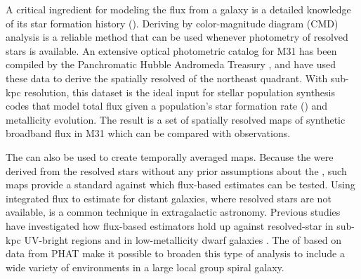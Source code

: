 \documentclass[iop, tighten]{emulateapj}
\begin{document}
A critical ingredient for modeling the flux from a galaxy is a detailed
knowledge of its star formation history (\sfh{}). Deriving  by
color-magnitude diagram (CMD) analysis is a reliable method that can be used
whenever photometry of resolved stars is available. An extensive optical
photometric catalog for M31 has been compiled by the Panchromatic Hubble
Andromeda Treasury \citep[PHAT;][]{Dalcanton:2012,Williams:2014}, and
\citet{Lewis:2015} have used these data to derive the spatially resolved \sfh{}
of the northeast quadrant. With sub-kpc resolution, this \sfh{} dataset is the
ideal input for stellar population synthesis codes that model total flux given a
population's star formation rate (\sfr{}) and metallicity evolution. The result
is a set of spatially resolved maps of synthetic broadband flux in M31 which can
be compared with observations.


\figi

The \citet{Lewis:2015}  can also be used to create temporally averaged
\sfr{} maps. Because the  were derived from the resolved stars without
any prior assumptions about the , such maps provide a standard against
which flux-based \sfr{} estimates \citep[e.g., using any of the calibrations
from][]{Kennicutt:2012} can be tested. Using integrated flux to estimate 
for distant galaxies, where resolved stars are not available, is a common
technique in extragalactic astronomy. Previous studies have investigated how
flux-based \sfr{} estimators hold up against resolved-star  in sub-kpc
UV-bright regions \citep{Simones:2014} and in low-metallicity dwarf galaxies
\citep{Johnson:2013,McQuinn:2015}. The  of \citet{Lewis:2015} based on
data from PHAT make it possible to broaden this type of analysis to include a
wide variety of environments in a large local group spiral galaxy.
\end{document}

